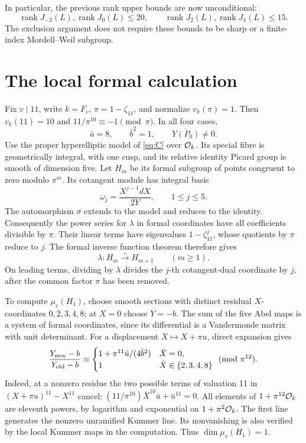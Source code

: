 \documentclass[11pt]{article}
\begin{document}
In particular, the previous rank upper bounds are now unconditional:
\[
 \operatorname{rank}J_{-2}(L),\operatorname{rank}J_0(L)\le20,
 \qquad \operatorname{rank}J_2(L),\operatorname{rank}J_4(L)\le15.
\]
The exclusion argument does not require these bounds to be sharp or a
finite-index Mordell--Weil subgroup.

\section{The local formal calculation}
Fix \(v\mid11\), write \(k=F_v\), \(\pi=1-\zeta_{11}\), and normalize
\(v_k(\pi)=1\). Then \(v_k(11)=10\) and
\(11/\pi^{10}\equiv-1\pmod\pi\). In all four cases,
\[
 \bar a=8,\qquad \bar b^2=1,\qquad \overline{Y(P_0)}\ne0.
\]
Use the proper hyperelliptic model of \eqref{eq:C} over \(\mathcal O_k\).
Its special fibre is geometrically integral, with one cusp, and its
relative identity Picard group is smooth of dimension five. Let
\(H_m\) be its formal subgroup of points congruent to zero modulo
\(\pi^m\). Its cotangent module has integral basis
\[
 \omega_j=\frac{X^{j-1}dX}{2Y},\qquad 1\le j\le5.
\]
The automorphism \(\sigma\) extends to the model and reduces to the
identity. Consequently the power series for \(\lambda\) in formal
coordinates have all coefficients divisible by \(\pi\). Their linear
terms have eigenvalues \(1-\zeta_{11}^j\), whose quotients by \(\pi\)
reduce to \(j\). The formal inverse function theorem therefore gives
\begin{equation}\label{eq:division}
 \lambda:H_m\xrightarrow{\sim}H_{m+1}\qquad(m\ge1).
\end{equation}
On leading terms, dividing by \(\lambda\) divides the \(j\)-th
cotangent-dual coordinate by \(j\), after the common factor \(\pi\)
has been removed.

To compute \(\mu_v(H_1)\), choose smooth sections with distinct
residual \(X\)-coordinates
\(0,2,3,4,8\); at \(X=0\) choose \(Y=-b\).
The sum of the five Abel maps is a system of formal coordinates, since
its differential is a Vandermonde matrix with unit determinant.
For a displacement \(X\mapsto X+\pi u\), direct expansion gives
\[
 \frac{Y_{\rm new}-b}{Y_{\rm old}-b}
 \equiv
 \begin{cases}
 1+\pi^{11}\bar u/(4\bar b^2)&\bar X=0,\\
 1&\bar X\in\{2,3,4,8\}
 \end{cases}\pmod{\pi^{12}}.
\]
Indeed, at a nonzero residue the two possible terms of valuation 11
in \((X+\pi u)^{11}-X^{11}\) cancel:
\( (11/\pi^{10})\bar X^{10}\bar u+\bar u^{11}=0\).
All elements of \(1+\pi^{12}\mathcal O_k\) are eleventh powers, by logarithm
and exponential on \(1+\pi^2\mathcal O_k\). The first line generates the
nonzero unramified Kummer line. Its nonvanishing is also verified by
the local Kummer maps in the computation. Thus \(\dim\mu_v(H_1)=1\).
\end{document}
